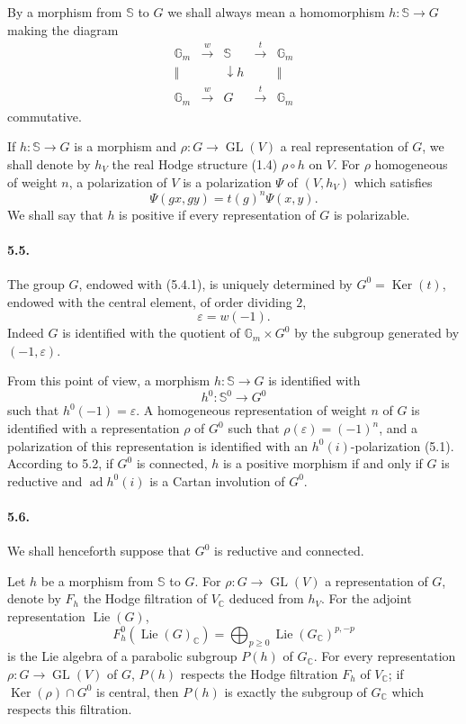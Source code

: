 \documentclass[10pt]{article}
\newcommand{\C}{\mathbb C}
\newcommand{\bS}{\mathbb S}
\newcommand{\Ker}{\operatorname{Ker}}
\theoremstyle{deligne}
\newcommand{\Lie}{\operatorname{Lie}}
\newcommand{\ad}{\operatorname{ad}}
\newcommand{\GL}{\operatorname{GL}}
\begin{document}
By a morphism from $\bS$ to $G$ we shall always mean a homomorphism $h:\bS\to G$ making the diagram
\[
\begin{array}{ccccc}
\mathbb G_m&\xrightarrow{w}&\bS&\xrightarrow{t}&\mathbb G_m\\
\Vert&&\downarrow h&&\Vert\\
\mathbb G_m&\xrightarrow{w}&G&\xrightarrow{t}&\mathbb G_m
\end{array}
\]
commutative.

If $h:\bS\to G$ is a morphism and $\rho:G\to\GL(V)$ a real representation of $G$, we shall denote by $h_V$ the real Hodge structure (1.4) $\rho\circ h$ on $V$. For $\rho$ homogeneous of weight $n$, a polarization of $V$ is a polarization $\Psi$ of $(V,h_V)$ which satisfies
\[
\tag{5.4.2}
  \Psi(gx,gy)=t(g)^n\Psi(x,y).
\]
We shall say that $h$ is positive if every representation of $G$ is polarizable.

\paragraph{5.5.}
The group $G$, endowed with (5.4.1), is uniquely determined by $G^0=\Ker(t)$, endowed with the central element, of order dividing $2$,
\[
  \varepsilon=w(-1).
\]
Indeed $G$ is identified with the quotient of $\mathbb G_m\times G^0$ by the subgroup generated by $(-1,\varepsilon)$.

From this point of view, a morphism $h:\bS\to G$ is identified with
\[
  h^0:\bS^0\to G^0
\]
such that $h^0(-1)=\varepsilon$. A homogeneous representation of weight $n$ of $G$ is identified with a representation $\rho$ of $G^0$ such that $\rho(\varepsilon)=(-1)^n$, and a polarization of this representation is identified with an $h^0(i)$-polarization (5.1). According to 5.2, if $G^0$ is connected, $h$ is a positive morphism if and only if $G$ is reductive and $\ad h^0(i)$ is a Cartan involution of $G^0$.

\paragraph{5.6.}
We shall henceforth suppose that $G^0$ is reductive and connected.

Let $h$ be a morphism from $\bS$ to $G$. For $\rho:G\to\GL(V)$ a representation of $G$, denote by $F_h$ the Hodge filtration of $V_\C$ deduced from $h_V$. For the adjoint representation $\Lie(G)$,
\[
\tag{5.6.1}
  F_h^0(\Lie(G)_\C)=\bigoplus_{p\ge0}\Lie(G_\C)^{p,-p}
\]
is the Lie algebra of a parabolic subgroup $P(h)$ of $G_\C$. For every representation $\rho:G\to\GL(V)$ of $G$, $P(h)$ respects the Hodge filtration $F_h$ of $V_\C$; if $\Ker(\rho)\cap G^0$ is central, then $P(h)$ is exactly the subgroup of $G_\C$ which respects this filtration.
\end{document}

